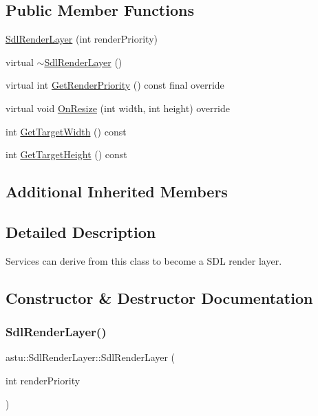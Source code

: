 \subsection*{Public Member Functions}
\begin{DoxyCompactItemize}
\item 
\hyperlink{classastu_1_1SdlRenderLayer_ac26ff4f37f843fdc97a27ccb70c8683c}{Sdl\+Render\+Layer} (int render\+Priority)
\item 
virtual \hyperlink{classastu_1_1SdlRenderLayer_adefbb130f5d9d21bd90b0022c4b9a11f}{$\sim$\+Sdl\+Render\+Layer} ()
\item 
virtual int \hyperlink{classastu_1_1SdlRenderLayer_ad7217b4bf8b8f0c9e801f72a44fe2f49}{Get\+Render\+Priority} () const final override
\item 
virtual void \hyperlink{classastu_1_1SdlRenderLayer_af9b0cfe1797705f509bc18db0c8a5320}{On\+Resize} (int width, int height) override
\item 
int \hyperlink{classastu_1_1SdlRenderLayer_a0351faee7eb27e3564c9337e0411722f}{Get\+Target\+Width} () const
\item 
int \hyperlink{classastu_1_1SdlRenderLayer_abb71d24b4f8bf008a29f7a313abc74ac}{Get\+Target\+Height} () const
\end{DoxyCompactItemize}
\subsection*{Additional Inherited Members}


\subsection{Detailed Description}
Services can derive from this class to become a S\+DL render layer. 

\subsection{Constructor \& Destructor Documentation}
\mbox{\label{classastu_1_1SdlRenderLayer_ac26ff4f37f843fdc97a27ccb70c8683c}} 
\subsubsection{\texorpdfstring{Sdl\+Render\+Layer()}{SdlRenderLayer()}}
{\footnotesize\ttfamily astu\+::\+Sdl\+Render\+Layer\+::\+Sdl\+Render\+Layer (\begin{DoxyParamCaption}\item[{int}]{render\+Priority }\end{DoxyParamCaption})}

